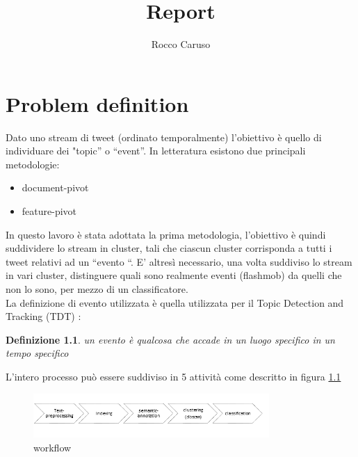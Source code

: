 \documentclass[a4paper,12pt]{report}
\title{Report}
\author{Rocco Caruso}
\begin{document}
\theoremstyle{definition}
\newtheorem{definizione}{Definizione}
\newtheorem{teorema}{Teorema}
\maketitle
\graphicspath{ {./immagini/} }%
\chapter{Problem definition}
 
Dato uno stream  di tweet (ordinato temporalmente) l’obiettivo  è quello di individuare dei "topic” o “event”. In letteratura esistono due principali metodologie: 
\begin{itemize}
\item document-pivot
\item feature-pivot
\end{itemize}
In questo lavoro è stata adottata la prima metodologia, l'obiettivo è quindi suddividere lo stream in cluster, tali che ciascun cluster corrisponda a tutti i tweet relativi ad un “evento “. E’ altresì necessario, una volta suddiviso lo stream in vari cluster, distinguere quali sono realmente eventi (flashmob) da quelli che non lo sono, per mezzo di un classificatore. \\
La definizione di evento utilizzata è quella utilizzata per il Topic Detection and Tracking (TDT) \cite{Allan:2002:TDT:772260} :
\begin{definizione}
\label{def:event}
\textit{un evento è qualcosa che accade in un luogo specifico in un tempo specifico}
\end{definizione}
L’intero processo può essere suddiviso in 5 attività come descritto in figura \ref{fig:workflow} 

\begin{figure}[h]
    \centering
    \includegraphics[width=0.8\textwidth]{workFlow}
    \caption{workflow}
    \label{fig:workflow}
\end{figure}  



\newpage 
 
\end{document}
